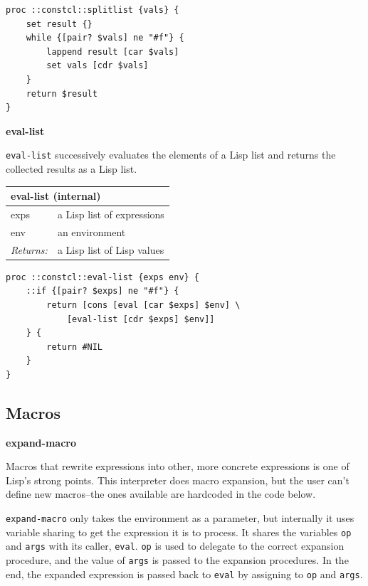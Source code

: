 \documentclass[twoside,9pt]{report}
\begin{document}
\noindent\makebox[\linewidth]{\rule{\linewidth}{0.4pt}}
\begin{lstlisting}
proc ::constcl::splitlist {vals} {
    set result {}
    while {[pair? $vals] ne "#f"} {
        lappend result [car $vals]
        set vals [cdr $vals]
    }
    return $result
}
\end{lstlisting}
\noindent\makebox[\linewidth]{\rule{\linewidth}{0.4pt}}

\textbf{eval-list}


\texttt{eval-list} successively evaluates the elements of a Lisp list and returns the collected results as a Lisp list.

\begin{tabular}{ |l l| }
\hline
\multicolumn{2}{|l|}{eval-list (internal)} \\
\hline
exps & a Lisp list of expressions \\
env & an environment \\
\textit{Returns:} & a Lisp list of Lisp values \\
\hline
\end{tabular}

\noindent\makebox[\linewidth]{\rule{\linewidth}{0.4pt}}
\begin{lstlisting}
proc ::constcl::eval-list {exps env} {
    ::if {[pair? $exps] ne "#f"} {
        return [cons [eval [car $exps] $env] \
            [eval-list [cdr $exps] $env]]
    } {
        return #NIL
    }
}
\end{lstlisting}
\noindent\makebox[\linewidth]{\rule{\linewidth}{0.4pt}}
\subsection{Macros}
\label{macros}

\textbf{expand-macro}


Macros that rewrite expressions into other, more concrete expressions is one of Lisp's strong points. This interpreter does macro expansion, but the user can't define new macros--the ones available are hardcoded in the code below.


\texttt{expand-macro} only takes the environment as a parameter, but internally it uses variable sharing to get the expression it is to process. It shares the variables \texttt{op} and \texttt{args} with its caller, \texttt{eval}. \texttt{op} is used to delegate to the correct expansion procedure, and the value of \texttt{args} is passed to the expansion procedures. In the end, the expanded expression is passed back to \texttt{eval} by assigning to \texttt{op} and \texttt{args}.
\end{document}
